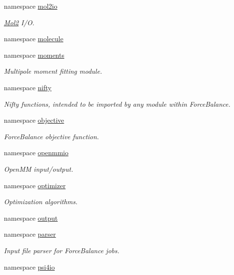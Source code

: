\begin{DoxyCompactItemize}
namespace \hyperlink{namespaceforcebalance_1_1mol2io}{mol2io}
\begin{DoxyCompactList}\small\item\em \hyperlink{namespaceforcebalance_1_1Mol2}{\-Mol2} \-I/\-O. \end{DoxyCompactList}\item 
namespace \hyperlink{namespaceforcebalance_1_1molecule}{molecule}
\item 
namespace \hyperlink{namespaceforcebalance_1_1moments}{moments}
\begin{DoxyCompactList}\small\item\em \-Multipole moment fitting module. \end{DoxyCompactList}\item 
namespace \hyperlink{namespaceforcebalance_1_1nifty}{nifty}
\begin{DoxyCompactList}\small\item\em \-Nifty functions, intended to be imported by any module within \-Force\-Balance. \end{DoxyCompactList}\item 
namespace \hyperlink{namespaceforcebalance_1_1objective}{objective}
\begin{DoxyCompactList}\small\item\em \-Force\-Balance objective function. \end{DoxyCompactList}\item 
namespace \hyperlink{namespaceforcebalance_1_1openmmio}{openmmio}
\begin{DoxyCompactList}\small\item\em \-Open\-M\-M input/output. \end{DoxyCompactList}\item 
namespace \hyperlink{namespaceforcebalance_1_1optimizer}{optimizer}
\begin{DoxyCompactList}\small\item\em \-Optimization algorithms. \end{DoxyCompactList}\item 
namespace \hyperlink{namespaceforcebalance_1_1output}{output}
\item 
namespace \hyperlink{namespaceforcebalance_1_1parser}{parser}
\begin{DoxyCompactList}\small\item\em \-Input file parser for \-Force\-Balance jobs. \end{DoxyCompactList}\item 
namespace \hyperlink{namespaceforcebalance_1_1psi4io}{psi4io}

\end{DoxyCompactItemize}
